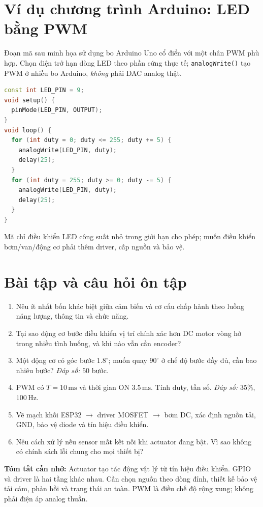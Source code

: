 \section{Ví dụ chương trình Arduino: LED bằng PWM}
Đoạn mã sau minh họa sử dụng bo Arduino Uno cổ điển với một chân PWM phù hợp. Chọn điện trở hạn dòng LED theo phần cứng thực tế; \texttt{analogWrite()} tạo PWM ở nhiều bo Arduino, \emph{không} phải DAC analog thật.
\begin{lstlisting}[language=C++,caption={Tăng/giảm độ sáng LED theo dạng tam giác}]
const int LED_PIN = 9;
void setup() {
  pinMode(LED_PIN, OUTPUT);
}
void loop() {
  for (int duty = 0; duty <= 255; duty += 5) {
    analogWrite(LED_PIN, duty);
    delay(25);
  }
  for (int duty = 255; duty >= 0; duty -= 5) {
    analogWrite(LED_PIN, duty);
    delay(25);
  }
}
\end{lstlisting}
Mã chỉ điều khiển LED công suất nhỏ trong giới hạn cho phép; muốn điều khiển bơm/van/động cơ phải thêm driver, cấp nguồn và bảo vệ.

\section{Bài tập và câu hỏi ôn tập}
\begin{enumerate}
\item Nêu ít nhất bốn khác biệt giữa cảm biến và cơ cấu chấp hành theo luồng năng lượng, thông tin và chức năng.
\item Tại sao động cơ bước điều khiển vị trí chính xác hơn DC motor vòng hở trong nhiều tình huống, và khi nào vẫn cần encoder?
\item Một động cơ có góc bước $1.8^\circ$; muốn quay $90^\circ$ ở chế độ bước đầy đủ, cần bao nhiêu bước? \emph{Đáp số:} $50$ bước.
\item PWM có $T=10\,\mathrm{ms}$ và thời gian ON $3.5\,\mathrm{ms}$. Tính duty, tần số. \emph{Đáp số:} $35\%$, $100\,\mathrm{Hz}$.
\item Vẽ mạch khối ESP32 $\to$ driver MOSFET $\to$ bơm DC, xác định nguồn tải, GND, bảo vệ diode và tín hiệu điều khiển.
\item Nêu cách xử lý nếu sensor mất kết nối khi actuator đang bật. Vì sao không có chính sách lỗi chung cho mọi thiết bị?
\end{enumerate}
\begin{notebox}\textbf{Tóm tắt cần nhớ:} Actuator tạo tác động vật lý từ tín hiệu điều khiển. GPIO và driver là hai tầng khác nhau. Cần chọn nguồn theo dòng đỉnh, thiết kế bảo vệ tải cảm, phản hồi và trạng thái an toàn. PWM là điều chế độ rộng xung; không phải điện áp analog thuần.\end{notebox}
